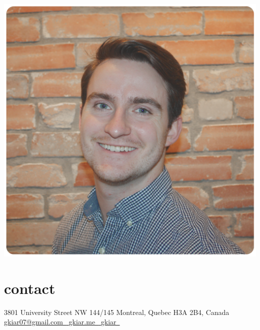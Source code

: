 \documentclass[]{friggeri-cv} %
\begin{document}


\begin{aside} %
\includegraphics[width=\textwidth]{./headshot_shorthair.png}
\section{contact}
3801 University Street
NW 144/145
Montreal, Quebec
H3A 2B4, Canada
~
\href{mailto:gkiar07@gmail.com}{gkiar07@gmail.com~{\color{red} \faEnvelope}}
\href{http://gkiar.github.io}{gkiar.me~{\color{lightblue} \faGlobe}}
\href{http://github.com/gkiar}{gkiar~{\color{purple} \faGithub}}
\href{https://twitter.com/g_kiar}{{\color{blue} \faTwitter}} \href{https://www.linkedin.com/in/gregkiar}{{\color{green} \faLinkedin}} \href{https://publons.com/author/1305375/gregory-kiar#profile}{{\color{plubblue} \aiPublons}} \href{http://orcid.org/0000-0001-8915-496X}{{\color{orcidgreen} \aiOrcid}} \href{https://scholar.google.com/citations?user=ztw6g7kAAAAJ&hl=en}{{\color{googred} \aiGoogleScholar}} \href{https://www.researchgate.net/profile/Gregory_Kiar}{{\color{gateteal} \aiResearchGate}}

\end{aside}
\end{document}
